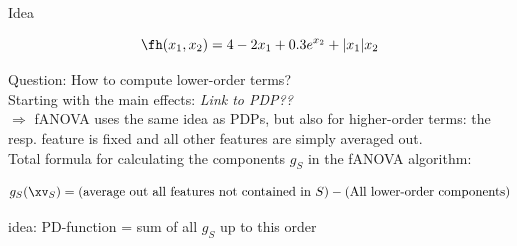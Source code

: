 \documentclass[11pt,compress,t,notes=noshow, aspectratio=169, xcolor=table]{beamer}
\begin{document}
\begin{frame}{Idea}

    \begin{equation}
        \fh(x_1, x_2) = 4 - 2x_1 + 0.3 e^{x_2} + |x_1|x_2
    \end{equation}

    Question: How to compute lower-order terms? \\
    Starting with the main effects: %
    \textit{Link to PDP??} \\
    \(\Rightarrow\) fANOVA uses the same idea as PDPs, but also for higher-order terms: the resp. feature is fixed and all other features are simply averaged out. \\

    Total formula for calculating the components \(g_S\) in the fANOVA algorithm:

    \begin{equation*}
        g_{S} (\xv_S) = (\text{average out all features not contained in } S) - (\text{All lower-order components})
    \end{equation*}

    idea: PD-function = sum of all $g_S$ up to this order
    
\end{frame}
\end{document}
